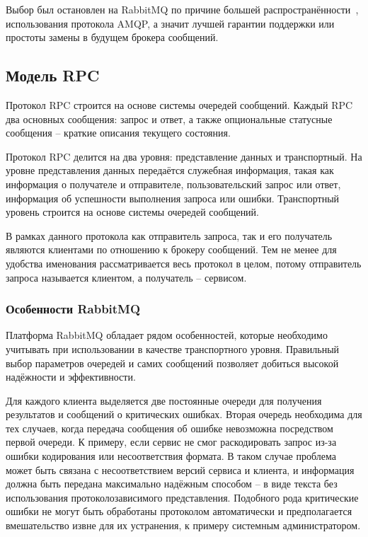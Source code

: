 Выбор был остановлен на RabbitMQ по причине большей
распространённости~\cite{mqcomparison}, использования протокола AMQP,
а значит лучшей гарантии поддержки или простоты замены в будущем брокера
сообщений.

\subsection{Модель RPC}
Протокол RPC строится на основе системы очередей сообщений.
Каждый RPC два основных сообщения: запрос и ответ, а также опциональные
статусные сообщения -- краткие описания текущего состояния.

Протокол RPC делится на два уровня: представление данных и транспортный.
На уровне представления данных передаётся служебная информация, такая как
информация о получателе и отправителе, пользовательский запрос или ответ,
информация об успешности выполнения запроса или ошибки.
Транспортный уровень строится на основе системы очередей сообщений.

В рамках данного протокола как отправитель запроса, так и его получатель
являются клиентами по отношению к брокеру сообщений. Тем не менее
для удобства именования рассматривается весь протокол в целом,
потому отправитель запроса называется клиентом, а получатель -- сервисом.

\subsubsection{Особенности RabbitMQ}
Платформа RabbitMQ обладает рядом особенностей, которые необходимо
учитывать при использовании в качестве транспортного уровня. Правильный
выбор параметров очередей и самих сообщений позволяет добиться высокой
надёжности и эффективности.

Для каждого клиента выделяется две постоянные очереди для получения результатов
и сообщений о критических ошибках. Вторая очередь необходима для тех случаев,
когда передача сообщения об ошибке невозможна посредством первой очереди.
К примеру, если сервис не смог раскодировать запрос из-за ошибки кодирования
или несоответствия формата. В таком случае проблема может быть связана
с несоответствием версий сервиса и клиента, и информация должна быть
передана максимально надёжным способом -- в виде текста без использования
протоколозависимого представления. Подобного рода критические ошибки
не могут быть обработаны протоколом автоматически и предполагается
вмешательство извне для их устранения, к примеру системным администратором.


